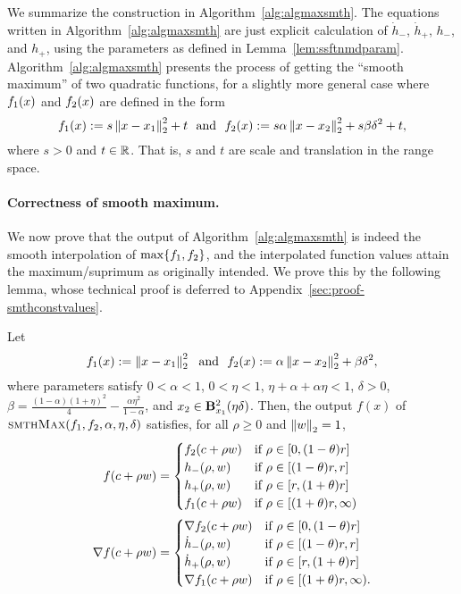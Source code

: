 We summarize the construction in Algorithm~\ref{alg:algmaxsmth}. The equations written in Algorithm~\ref{alg:algmaxsmth} are just explicit calculation of $\dot h_-$, $\dot h_+$, $h_-$, and $h_+$, using the parameters as defined in Lemma~\ref{lem:ssftnmdparam}. 
Algorithm~\ref{alg:algmaxsmth} presents the process of getting the ``smooth maximum'' of two quadratic functions,
for a slightly more general case where $f_{1}(x)$ and $f_{2}(x)$ are defined in the form
\begin{equation*}
	f_{1}(x) := s\left\|{x-x_1 }\right\|_2^2 + t ~~\text{and}~~
	f_{2}(x) := s\alpha \left\|{x-x_2}\right\|_2^2 + s\beta \delta^2 + t,
\end{equation*}
where $s > 0$ and $t \in \mathbb{R}$. That is, $s$ and $t$ are scale and translation in the range space. 

\paragraph{Correctness of smooth maximum.}
We now prove that the output of Algorithm~\ref{alg:algmaxsmth} is
indeed the smooth interpolation of $\max \{f_{1}, f_{2}\}$,
and the interpolated function values attain the maximum/suprimum as originally intended.
We prove this by the following lemma, whose technical proof is deferred to Appendix~\ref{sec:proof-smthconstvalues}.
\begin{lemma}
	\label{lem:smthconstvalues}
	Let 
	\begin{equation*}
		f_{1}(x) := \left\|{x-x_1 }\right\|_2^2 ~~\text{and}~~
		f_{2}(x) := \alpha \left\|{x-x_2}\right\|_2^2 + \beta \delta^2,
	\end{equation*}
	where parameters satisfy $0<\alpha<1$, $0<\eta<1$, $\eta+\alpha+\alpha\eta<1$, $\delta>0$, $\beta = \frac{(1-\alpha)(1+\eta)^2}{4} - \frac{\alpha \eta^2}{1-\alpha}$, and $x_2 \in \mathbf{B}^2_{x_1}({\eta\delta})$.
	Then, the output $f(x)$ of $\textsc{smthMax}(f_{1}, f_{2}, \alpha, \eta, \delta)$
	satisfies, for all $\rho \geq 0$ and $\left\|{w}\right\|_2 = 1$,
	\begin{align*}
		f(c+\rho w) &=
		\begin{cases}
			f_{2}(c+\rho w) 	& \text{if } \rho \in [0, (1-\theta)r]\\
			h_-(\rho, w) 		& \text{if } \rho \in [(1-\theta)r,r]\\
			h_+(\rho, w) 		& \text{if } \rho \in [r,(1+\theta) r]\\
			f_{1}(c+\rho w) 	& \text{if } \rho \in [(1+\theta) r, \infty)
		\end{cases}\\
		\nabla f(c+\rho w) &=
		\begin{cases}
			\nabla f_{2}(c+\rho w) 	& \text{if } \rho \in [0, (1-\theta)r]\\
			\dot h_-(\rho, w) 		& \text{if } \rho \in [(1-\theta)r,r]\\
			\dot h_+(\rho, w) 		& \text{if } \rho \in [r,(1+\theta) r]\\
			\nabla f_{1}(c+\rho w) 	& \text{if } \rho \in [(1+\theta) r, \infty).
		\end{cases}
	\end{align*}
\end{lemma}
